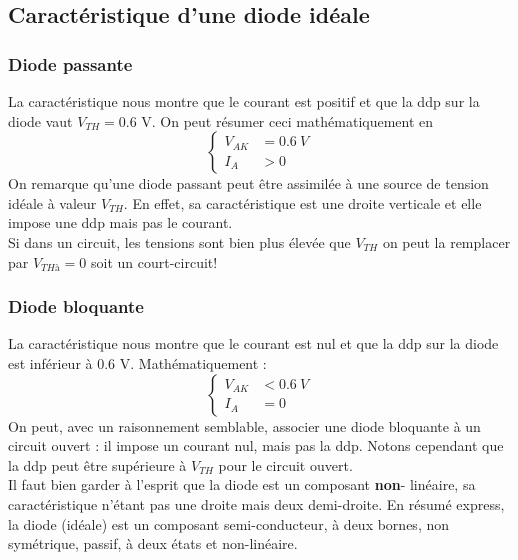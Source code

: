 		\subsection{Caractéristique d'une diode idéale}
			\subsubsection{Diode passante}
			La caractéristique nous montre que le courant est positif et que la 
			ddp sur la diode vaut $V_{TH} = 0.6$ V. On peut résumer ceci 
			mathématiquement en
			\begin{equation}
			\left\{\begin{array}{ll}
			V_{AK} &= 0.6\ V\\
			I_A &> 0
			\end{array}\right.
			\end{equation}
			On remarque qu'une diode passant peut être assimilée à une source de 
			tension idéale à valeur $V_{TH}$. En effet, sa caractéristique est une 
			droite verticale et elle impose une ddp mais pas le courant.\\
			Si dans un circuit, les tensions sont bien plus élevée que $V_{TH}$ on 
			peut la remplacer par $V_{THà}=0$ soit un court-circuit!
			
			\subsubsection{Diode bloquante}
			La caractéristique nous montre que le courant est nul et que la ddp sur 
			la diode est inférieur à 0.6 V. Mathématiquement :
			\begin{equation}
			\left\{\begin{array}{ll}
			V_{AK} &< 0.6\ V\\
			I_A &= 0
			\end{array}\right.
			\end{equation}	
			On peut, avec un raisonnement semblable, associer une diode bloquante à
			un circuit ouvert : il impose un courant nul, mais pas la ddp. Notons 
			cependant que la ddp peut être supérieure à $V_{TH}$ pour le circuit 
			ouvert.\\
			
		Il faut bien garder à l'esprit que la diode est un composant \textbf{non}-
		linéaire, sa caractéristique n'étant pas une droite mais deux demi-droite. 
		En résumé express, la diode (idéale) est un composant semi-conducteur, à deux
		bornes, non symétrique, passif, à deux états et non-linéaire.
		

